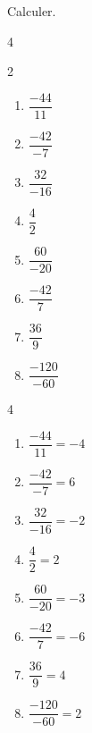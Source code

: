 \begin{exercice*}
    Calculer.
    \begin{multicols}4
      \begin{spacing}2
        \begin{enumerate}
          \item $\dfrac{-44}{11}$
          \item $\dfrac{-42}{-7}$
          \item $\dfrac{32}{-16}$
          \item $\dfrac{4}{2}$
          \item $\dfrac{60}{-20}$
          \item $\dfrac{-42}{7}$
          \item $\dfrac{36}{9}$
          \item $\dfrac{-120}{-60}$
        \end{enumerate}
      \end{spacing}
    \end{multicols}
\end{exercice*}
\begin{corrige}
    \phantom{rrr}
    \begin{multicols}4
      \begin{spacing}{2}
        \begin{enumerate}
          \item $\dfrac{-44}{11}=-4$
          \item $\dfrac{-42}{-7}=6$
          \item $\dfrac{32}{-16}=-2$
          \item $\dfrac{4}{2}=2$
          \item $\dfrac{60}{-20}=-3$
          \item $\dfrac{-42}{7}=-6$
          \item $\dfrac{36}{9}=4$
          \item $\dfrac{-120}{-60}=2$
        \end{enumerate}
      \end{spacing}
    \end{multicols}
\end{corrige}

